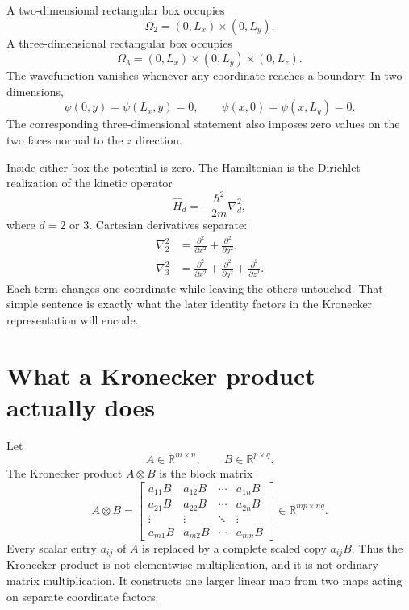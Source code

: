 A two-dimensional rectangular box occupies
\begin{equation}
  \Omega_2=(0,L_x)\times(0,L_y).
\end{equation}
A three-dimensional rectangular box occupies
\begin{equation}
  \Omega_3=(0,L_x)\times(0,L_y)\times(0,L_z).
\end{equation}
The wavefunction vanishes whenever any coordinate reaches a boundary. In two
dimensions,
\begin{equation}
  \psi(0,y)=\psi(L_x,y)=0,
  \qquad
  \psi(x,0)=\psi(x,L_y)=0.
\end{equation}
The corresponding three-dimensional statement also imposes zero values on the
two faces normal to the \(z\) direction.

Inside either box the potential is zero. The Hamiltonian is the Dirichlet
realization of the kinetic operator
\begin{equation}
  \hat H_d=-\frac{\hbar^2}{2m}\nabla_d^2,
\end{equation}
where \(d=2\) or \(3\). Cartesian derivatives separate:
\begin{align}
  \nabla_2^2
  &=\frac{\partial^2}{\partial x^2}
    +\frac{\partial^2}{\partial y^2},\\
  \nabla_3^2
  &=\frac{\partial^2}{\partial x^2}
    +\frac{\partial^2}{\partial y^2}
    +\frac{\partial^2}{\partial z^2}.
\end{align}
Each term changes one coordinate while leaving the others untouched. That
simple sentence is exactly what the later identity factors in the Kronecker
representation will encode.

\section{What a Kronecker product actually does}

Let
\begin{equation}
  A\in\mathbb R^{m\times n},
  \qquad
  B\in\mathbb R^{p\times q}.
\end{equation}
The Kronecker product \(A\otimes B\) is the block matrix
\begin{equation}
  A\otimes B
  =
  \begin{bmatrix}
    a_{11}B & a_{12}B & \cdots & a_{1n}B\\
    a_{21}B & a_{22}B & \cdots & a_{2n}B\\
    \vdots & \vdots & \ddots & \vdots\\
    a_{m1}B & a_{m2}B & \cdots & a_{mn}B
  \end{bmatrix}
  \in\mathbb R^{mp\times nq}.
\end{equation}
Every scalar entry \(a_{ij}\) of \(A\) is replaced by a complete scaled copy
\(a_{ij}B\). Thus the Kronecker product is not elementwise multiplication, and
it is not ordinary matrix multiplication. It constructs one larger linear map
from two maps acting on separate coordinate factors.

